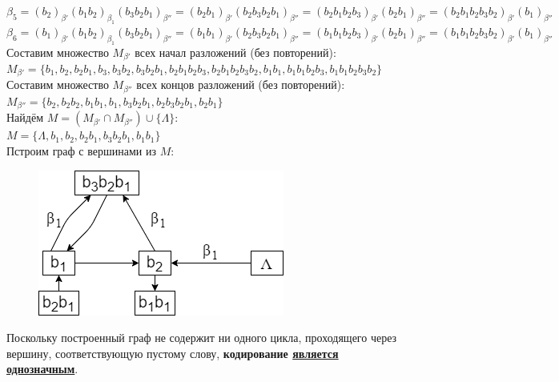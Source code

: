 $ %
\beta_5 = 
(b_2)_{\beta'}(b_1b_2)_{\beta_1}(b_3b_2b_1)_{\beta''} =
(b_2b_1)_{\beta'}(b_2b_3b_2b_1)_{\beta''}  =
(b_2b_1b_2b_3)_{\beta'}(b_2b_1)_{\beta''}  =
(b_2b_1b_2b_3b_2)_{\beta'}(b_1)_{\beta''}
$
\\

$ 
\beta_6 = 
(b_1)_{\beta'}(b_1b_2)_{\beta_1}(b_3b_2b_1)_{\beta''} = 
(b_1b_1)_{\beta'}(b_2b_3b_2b_1)_{\beta''}  =
(b_1b_1b_2b_3)_{\beta'}(b_2b_1)_{\beta''}  =
(b_1b_1b_2b_3b_2)_{\beta'}(b_1)_{\beta''} 
$
\\

Составим множество $ M_{\beta'} $ всех начал разложений (без повторений):\\

$ 
M_{\beta'} = \{
b_1, 
b_2, 
b_2b_1, 
b_3,
b_3b_2, 
b_3b_2b_1, 
b_2b_1b_2b_3,
b_2b_1b_2b_3b_2, 
b_1b_1, 
b_1b_1b_2b_3, 
b_1b_1b_2b_3b_2
\}
$
\\

Составим множество $ M_{\beta''} $ всех концов разложений (без повторений):\\

$ 
M_{\beta''} = \{
b_2,
b_2b_2,
b_1b_1,
b_1,
b_3b_2b_1,
b_2b_3b_2b_1,
b_2b_1
\}
$
\\

Найдём $ M = (M_{\beta'} \cap M_{\beta''}) \cup \{\Lambda\} $:\\

$ M = \{
\Lambda,
b_1,
b_2,
b_2b_1,
b_3b_2b_1,
b_1b_1
\} 
$
\\

Пстроим граф с вершинами из $ M $:

\begin{figure}[hpt!]
    \centering
    \includegraphics{photo/graph}
\end{figure}

Поскольку построенный граф не содержит ни одного цикла, проходящего через вершину, соответствующую пустому слову, \textbf{кодирование \underline{является однозначным}}.